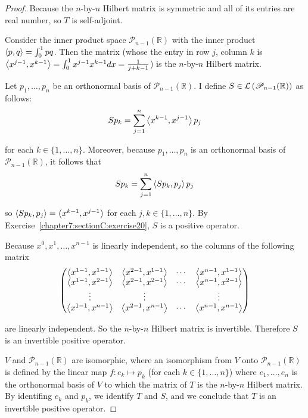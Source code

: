\begin{proof}
    Because the $n$-by-$n$ Hilbert matrix is symmetric and all of its entries are real number, so $T$ is self-adjoint.

    Consider the inner product space $\mathscr{P}_{n-1}(\mathbb{R})$ with the inner product $\left\langle{p, q}\right\rangle = \int^{1}_{0}pq$. Then the matrix (whose the entry in row $j$, column $k$ is $\left\langle{x^{j-1}, x^{k-1}}\right\rangle = \int^{1}_{0}x^{j-1}x^{k-1}dx = \frac{1}{j + k - 1}$) is the $n$-by-$n$ Hilbert matrix.

    Let $p_{1}, \ldots, p_{n}$ be an orthonormal basis of $\mathscr{P}_{n-1}(\mathbb{R})$. I define $S\in\mathcal{L}\left({\mathscr{P}_{n-1}(\mathbb{R})}\right)$ as follows:
    \[
        Sp_{k} = \sum^{n}_{j=1}\left\langle{x^{k-1}, x^{j-1}}\right\rangle p_{j}
    \]

    for each $k\in\{1,\ldots, n\}$. Moreover, because $p_{1}, \ldots, p_{n}$ is an orthonormal basis of $\mathscr{P}_{n-1}(\mathbb{R})$, it follows that
    \[
        Sp_{k} = \sum^{n}_{j=1}\left\langle{Sp_{k}, p_{j}}\right\rangle p_{j}
    \]

    so $\left\langle{Sp_{k}, p_{j}}\right\rangle = \left\langle{x^{k-1}, x^{j-1}}\right\rangle$ for each $j, k\in \{ 1,\ldots,n \}$. By Exercise~\ref{chapter7:sectionC:exercise20}, $S$ is a positive operator.

    Because $x^{0}, x^{1}, \ldots, x^{n-1}$ is linearly independent, so the columns of the following matrix
    \[
        \begin{pmatrix}
            \left\langle{x^{1-1}, x^{1-1}}\right\rangle & \left\langle{x^{2-1}, x^{1-1}}\right\rangle & \cdots & \left\langle{x^{n-1}, x^{1-1}}\right\rangle \\
            \left\langle{x^{1-1}, x^{2-1}}\right\rangle & \left\langle{x^{2-1}, x^{2-1}}\right\rangle & \cdots & \left\langle{x^{n-1}, x^{2-1}}\right\rangle \\
            \vdots                       & \vdots                       &        & \vdots                       \\
            \left\langle{x^{1-1}, x^{n-1}}\right\rangle & \left\langle{x^{2-1}, x^{n-1}}\right\rangle & \cdots & \left\langle{x^{n-1}, x^{n-1}}\right\rangle \\
        \end{pmatrix}
    \]

    are linearly independent. So the $n$-by-$n$ Hilbert matrix is invertible. Therefore $S$ is an invertible positive operator.

    \bigskip
    $V$ and $\mathscr{P}_{n-1}(\mathbb{R})$ are isomorphic, where an isomorphism from $V$ onto $\mathscr{P}_{n-1}(\mathbb{R})$ is defined by the linear map $f: e_{k}\mapsto p_{k}$ (for each $k\in\{1,\ldots,n\}$) where $e_{1}, \ldots, e_{n}$ is the orthonormal basis of $V$ to which the matrix of $T$ is the $n$-by-$n$ Hilbert matrix. By identifing $e_{k}$ and $p_{k}$, we identify $T$ and $S$, and we conclude that $T$ is an invertible positive operator.
\end{proof}
\newpage

